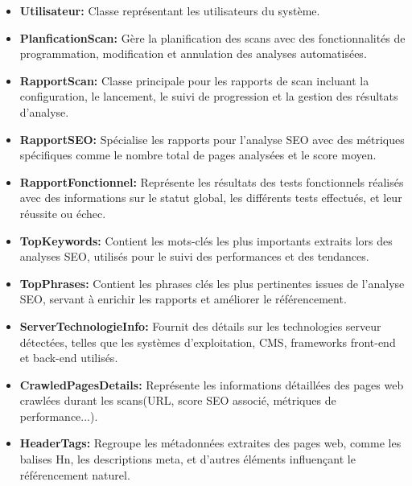     \begin{itemize}[label=$*$]
        \item \textbf{Utilisateur:} Classe représentant les utilisateurs du système.  
        \item \textbf{PlanficationScan:} Gère la planification des scans avec des fonctionnalités de programmation, modification et annulation des analyses automatisées.
        
        \item \textbf{RapportScan:} Classe principale pour les rapports de scan incluant la configuration, le lancement, le suivi de progression et la gestion des résultats d'analyse.
        
        \item \textbf{RapportSEO:} Spécialise les rapports pour l'analyse SEO avec des métriques spécifiques comme le nombre total de pages analysées et le score moyen.
        
        \item \textbf{RapportFonctionnel:} Représente les résultats des tests fonctionnels réalisés avec des informations sur le statut global, les différents tests effectués, et leur réussite ou échec.
        
        \item \textbf{TopKeywords:} Contient les mots-clés les plus importants extraits lors des analyses SEO, utilisés pour le suivi des performances et des tendances.
        
        \item \textbf{TopPhrases:} Contient les phrases clés les plus pertinentes issues de l'analyse SEO, servant à enrichir les rapports et améliorer le référencement.
        
        \item \textbf{ServerTechnologieInfo:} Fournit des détails sur les technologies serveur détectées, telles que les systèmes d'exploitation, CMS, frameworks front-end et back-end utilisés.
        
        \item \textbf{CrawledPagesDetails:} Représente les informations détaillées des pages web crawlées durant les scans(URL, score SEO associé, métriques de performance...).
        
        \item \textbf{HeaderTags:} Regroupe les métadonnées extraites des pages web, comme les balises Hn, les descriptions meta, et d'autres éléments influençant le référencement naturel.


\end{itemize}
